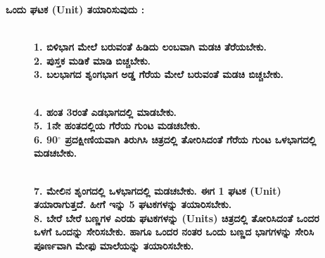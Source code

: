 \noindent
\textbf{ಒಂದು ಘಟಕ (Unit) ತಯಾರಿಸುವುದು :}
\begin{figure}[H]
\\
\textbf{1. ಬಿಳಿಭಾಗ ಮೇಲೆ ಬರುವಂತೆ ಹಿಡಿದು ಲಂಬವಾಗಿ ಮಡಚಿ ತೆರೆಯಬೇಕು.}\\
\textbf{2. ಪುಸ್ತಕ ಮಡಿಕೆ ಮಾಡಿ ಬಿಚ್ಚಬೇಕು.}\\
\textbf{3. ಬಲಭಾಗದ ಶೃಂಗಭಾಗ ಅಡ್ಡ ಗೆರೆಯ ಮೇಲೆ ಬರುವಂತೆ ಮಡಚಿ ಬಿಚ್ಚಬೇಕು.}
\end{figure}
\begin{figure}[H]
\\
\textbf{4. ಹಂತ 3ರಂತೆ ಎಡಭಾಗದಲ್ಲಿ ಮಾಡಬೇಕು.}\\
\textbf{5. 1ನೇ ಹಂತದಲ್ಲಿಯ ಗೆರೆಯ ಗುಂಟ ಮಡಚಬೇಕು.}\\
\textbf{6. 90$^{\circ}$ ಪ್ರದಕ್ಷೀಣಿಯವಾಗಿ ತಿರುಗಿಸಿ ಚಿತ್ರದಲ್ಲಿ ತೋರಿಸಿದಂತೆ ಗೆರೆಯ ಗುಂಟ ಒಳಭಾಗದಲ್ಲಿ ಮಡಚಬೇಕು. }
\end{figure}
\begin{figure}[H]
\\
\textbf{7. ಮೇಲಿನ ಶೃಂಗದಲ್ಲಿ ಒಳಭಾಗದಲ್ಲಿ ಮಡಚಬೇಕು. ಈಗ 1 ಘಟಕ (Unit) ತಯಾರಾಗುತ್ತದೆ. ಹೀಗೆ ಇನ್ನು 5 ಘಟಕಗಳನ್ನು ತಯಾರಿಸಬೇಕು.}\\
\textbf{8. ಬೇರೆ ಬೇರೆ ಬಣ್ಣಗಳ ಎರಡು ಘಟಕಗಳನ್ನು (Units) ಚಿತ್ರದಲ್ಲಿ ತೋರಿಸಿದಂತೆ ಒಂದರ ಒಳಗೆ ಒಂದನ್ನು ಸೇರಿಸಬೇಕು. ಹಾಗೂ ಒಂದರ ನಂತರ ಒಂದು ಬಣ್ಣದ ಭಾಗಗಳನ್ನು ಸೇರಿಸಿ ಪೂರ್ಣವಾಗಿ ಮೇಫು ಮಾಲೆಯನ್ನು ತಯಾರಿಸಬೇಕು.}
\end{figure}

